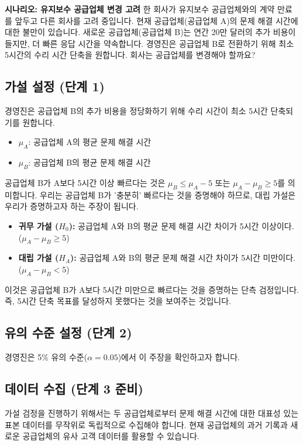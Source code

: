 \documentclass[11pt,a4paper]{article}
\begin{document}
\begin{examplebox}
\textbf{시나리오: 유지보수 공급업체 변경 고려}
한 회사가 유지보수 공급업체와의 계약 만료를 앞두고 다른 회사를 고려 중입니다. 현재 공급업체(공급업체 A)의 문제 해결 시간에 대한 불만이 있습니다. 새로운 공급업체(공급업체 B)는 연간 20만 달러의 추가 비용이 들지만, 더 빠른 응답 시간을 약속합니다. 경영진은 공급업체 B로 전환하기 위해 최소 5시간의 수리 시간 단축을 원합니다. 회사는 공급업체를 변경해야 할까요?
\end{examplebox}

\subsection*{가설 설정 (단계 1)}
경영진은 공급업체 B의 추가 비용을 정당화하기 위해 수리 시간이 최소 5시간 단축되기를 원합니다.
\begin{itemize}
    \item $\mu_A$: 공급업체 A의 평균 문제 해결 시간
    \item $\mu_B$: 공급업체 B의 평균 문제 해결 시간
\end{itemize}
공급업체 B가 A보다 5시간 이상 빠르다는 것은 $\mu_B \le \mu_A - 5$ 또는 $\mu_A - \mu_B \ge 5$를 의미합니다.
우리는 공급업체 B가 '충분히' 빠르다는 것을 증명해야 하므로, 대립 가설은 우리가 증명하고자 하는 주장이 됩니다.

\begin{itemize}
    \item \textbf{귀무 가설 ($H_0$):} 공급업체 A와 B의 평균 문제 해결 시간 차이가 5시간 이상이다.
    ($\mu_A - \mu_B \ge 5$)
    \item \textbf{대립 가설 ($H_A$):} 공급업체 A와 B의 평균 문제 해결 시간 차이가 5시간 미만이다.
    ($\mu_A - \mu_B < 5$)
\end{itemize}
이것은 공급업체 B가 A보다 5시간 미만으로 빠르다는 것을 증명하는 단측 검정입니다. 즉, 5시간 단축 목표를 달성하지 못했다는 것을 보여주는 것입니다.

\subsection*{유의 수준 설정 (단계 2)}
경영진은 5\% 유의 수준($\alpha = 0.05$)에서 이 주장을 확인하고자 합니다.

\subsection*{데이터 수집 (단계 3 준비)}
가설 검정을 진행하기 위해서는 두 공급업체로부터 문제 해결 시간에 대한 대표성 있는 표본 데이터를 무작위로 독립적으로 수집해야 합니다. 현재 공급업체의 과거 기록과 새로운 공급업체의 유사 고객 데이터를 활용할 수 있습니다.
\end{document}
